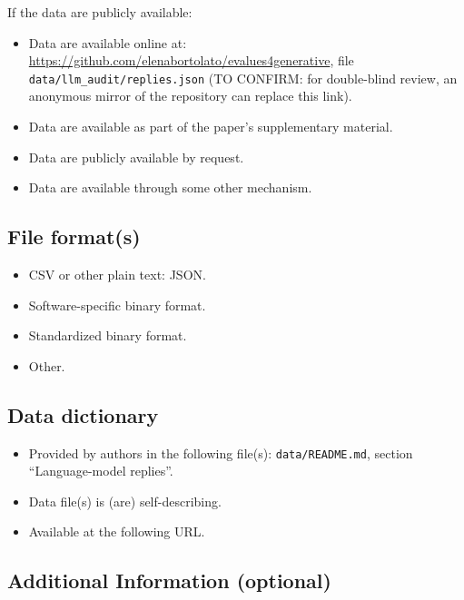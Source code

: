 \documentclass[11pt]{article}
\providecommand{\tightlist}{\setlength{\itemsep}{0pt}\setlength{\parskip}{0pt}}
\begin{document}
If the data are publicly available:

\begin{itemize}
\tightlist
\item[$\boxtimes$]
  Data are available online at:
  \url{https://github.com/elenabortolato/evalues4generative}, file
  \texttt{data/llm\_audit/replies.json} (TO CONFIRM: for double-blind
  review, an anonymous mirror of the repository can replace this link).
\item[$\square$]
  Data are available as part of the paper's supplementary material.
\item[$\square$]
  Data are publicly available by request.
\item[$\square$]
  Data are available through some other mechanism.
\end{itemize}

\hypertarget{file-formats}{%
\subsection{File format(s)}\label{file-formats}}

\begin{itemize}
\tightlist
\item[$\boxtimes$]
  CSV or other plain text: JSON.
\item[$\square$]
  Software-specific binary format.
\item[$\square$]
  Standardized binary format.
\item[$\square$]
  Other.
\end{itemize}

\hypertarget{data-dictionary}{%
\subsection{Data dictionary}\label{data-dictionary}}

\begin{itemize}
\tightlist
\item[$\boxtimes$]
  Provided by authors in the following file(s): \texttt{data/README.md},
  section ``Language-model replies''.
\item[$\square$]
  Data file(s) is (are) self-describing.
\item[$\square$]
  Available at the following URL.
\end{itemize}

\hypertarget{additional-information-optional}{%
\subsection{Additional Information
(optional)}\label{additional-information-optional}}
\end{document}
